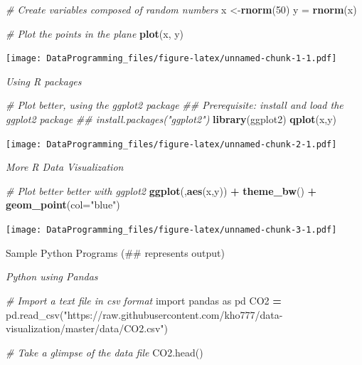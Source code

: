 \documentclass[]{book}
\newenvironment{Shaded}{\begin{snugshade}}{\end{snugshade}}
\newcommand{\CommentTok}[1]{\textcolor[rgb]{0.56,0.35,0.01}{\textit{#1}}}
\newcommand{\DataTypeTok}[1]{\textcolor[rgb]{0.13,0.29,0.53}{#1}}
\newcommand{\DecValTok}[1]{\textcolor[rgb]{0.00,0.00,0.81}{#1}}
\newcommand{\ImportTok}[1]{#1}
\newcommand{\KeywordTok}[1]{\textcolor[rgb]{0.13,0.29,0.53}{\textbf{#1}}}
\newcommand{\NormalTok}[1]{#1}
\newcommand{\OperatorTok}[1]{\textcolor[rgb]{0.81,0.36,0.00}{\textbf{#1}}}
\newcommand{\StringTok}[1]{\textcolor[rgb]{0.31,0.60,0.02}{#1}}
\begin{document}
\begin{Shaded}
\begin{Highlighting}[]
\CommentTok{# Create variables composed of random numbers}
\NormalTok{x <-}\KeywordTok{rnorm}\NormalTok{(}\DecValTok{50}\NormalTok{) }
\NormalTok{y =}\StringTok{ }\KeywordTok{rnorm}\NormalTok{(x)}

\CommentTok{# Plot the points in the plane }
\KeywordTok{plot}\NormalTok{(x, y)}
\end{Highlighting}
\end{Shaded}

\texttt{[image: DataProgramming\_files/figure-latex/unnamed-chunk-1-1.pdf]}

\emph{Using R packages}

\begin{Shaded}
\begin{Highlighting}[]
\CommentTok{# Plot better, using the ggplot2 package }
\CommentTok{## Prerequisite: install and load the ggplot2 package}
\CommentTok{## install.packages("ggplot2")}
\KeywordTok{library}\NormalTok{(ggplot2)}
\KeywordTok{qplot}\NormalTok{(x,y)}
\end{Highlighting}
\end{Shaded}

\texttt{[image: DataProgramming\_files/figure-latex/unnamed-chunk-2-1.pdf]}

\emph{More R Data Visualization}

\begin{Shaded}
\begin{Highlighting}[]
\CommentTok{# Plot better better with ggplot2}
\KeywordTok{ggplot}\NormalTok{(,}\KeywordTok{aes}\NormalTok{(x,y)) }\OperatorTok{+}\StringTok{ }\KeywordTok{theme_bw}\NormalTok{() }\OperatorTok{+}\StringTok{ }\KeywordTok{geom_point}\NormalTok{(}\DataTypeTok{col=}\StringTok{"blue"}\NormalTok{)}
\end{Highlighting}
\end{Shaded}

\texttt{[image: DataProgramming\_files/figure-latex/unnamed-chunk-3-1.pdf]}

Sample Python Programs (\#\# represents output)

\emph{Python using Pandas}

\begin{Shaded}
\begin{Highlighting}[]

\CommentTok{# Import a text file in csv format}
\ImportTok{import}\NormalTok{ pandas }\ImportTok{as}\NormalTok{ pd}
\NormalTok{CO2 }\OperatorTok{=}\NormalTok{ pd.read_csv(}\StringTok{"https://raw.githubusercontent.com/kho777/data-visualization/master/data/CO2.csv"}\NormalTok{)}

\CommentTok{# Take a glimpse of the data file}
\NormalTok{CO2.head()}
\end{Highlighting}
\end{Shaded}
\end{document}
